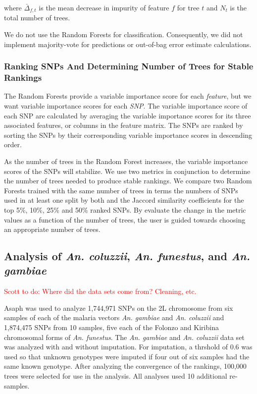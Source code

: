 where $\bar{\Delta}_{f, t}$ is the mean decrease in impurity of feature $f$ for tree $t$ and $N_t$ is the total number of trees.

We do not use the Random Forests for classification.  Consequently, we did not implement majority-vote for predictions or out-of-bag error estimate calculations.

\subsubsection{Ranking SNPs And Determining Number of Trees for Stable Rankings}
The Random Forests provide a variable importance score for each \emph{feature}, but we want variable importance scores for each \emph{SNP}. The variable importance score of each SNP are calculated by averaging the variable importance scores for its three associated features, or columns in the feature matrix.  The SNPs are ranked by sorting the SNPs by their corresponding variable importance scores in descending order.  

As the number of trees in the Random Forest increases, the variable importance scores of the SNPs will stabilize.  We use two metrics in conjunction to determine the number of trees needed to produce stable rankings. We compare two Random Forests trained with the same number of trees in terms the numbers of SNPs used in at least one split by both and the Jaccord similarity coefficients for the top 5\%, 10\%, 25\% and 50\% ranked SNPs.  By evaluate the change in the metric values as a function of the number of trees, the user is guided towards choosing an appropriate number of trees.

\subsection{Analysis of \emph{An. coluzzii}, \emph{An. funestus}, and \emph{An. gambiae}}
\textcolor{red}{Scott to do: Where did the data sets come from?  Cleaning, etc.}

Asaph was used to analyze 1,744,971 SNPs on the 2L chromosome from six samples of each of the malaria vectors \emph{An. gambiae} and \emph{An. coluzzii} and 1,874,475 SNPs from 10 samples, five each of the Folonzo and Kiribina chromosomal forms of \emph{An. funestus}. The \emph{An. gambiae} and \emph{An. coluzzii} data set was analyzed with and without imputation. For imputation, a thrshold of 0.6 was used so that unknown genotypes were imputed if four out of six samples had the same known genotype.  After analyzing the convergence of the rankings, 100,000 trees were selected for use in the analysis.  All analyses used 10 additional re-samples.

